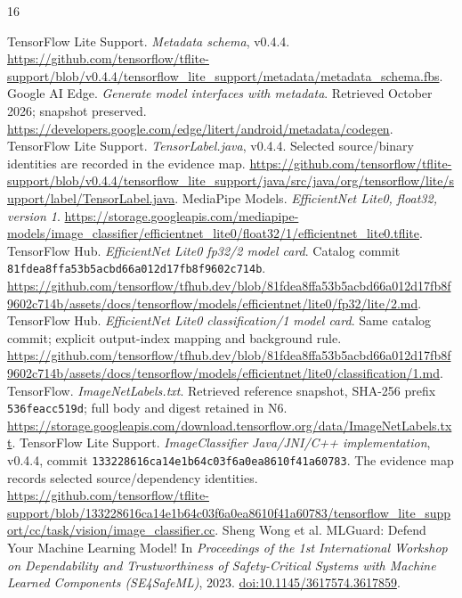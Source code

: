 \documentclass[10pt,conference]{IEEEtran}
\newcommand{\code}[1]{\texttt{#1}}
\begin{document}
\begin{thebibliography}{16}\small\raggedright
{} TensorFlow Lite Support. \emph{Metadata schema}, v0.4.4. \url{https://github.com/tensorflow/tflite-support/blob/v0.4.4/tensorflow_lite_support/metadata/metadata_schema.fbs}.
 Google AI Edge. \emph{Generate model interfaces with metadata}. Retrieved October 2026; snapshot preserved. \url{https://developers.google.com/edge/litert/android/metadata/codegen}.
 TensorFlow Lite Support. \emph{TensorLabel.java}, v0.4.4. Selected source/binary identities are recorded in the evidence map. \url{https://github.com/tensorflow/tflite-support/blob/v0.4.4/tensorflow_lite_support/java/src/java/org/tensorflow/lite/support/label/TensorLabel.java}.
 MediaPipe Models. \emph{EfficientNet Lite0, float32, version 1}. \url{https://storage.googleapis.com/mediapipe-models/image_classifier/efficientnet_lite0/float32/1/efficientnet_lite0.tflite}.
 TensorFlow Hub. \emph{EfficientNet Lite0 fp32/2 model card}. Catalog commit \code{81fdea8ffa53b5acbd66a012d17fb8f9602c714b}. \url{https://github.com/tensorflow/tfhub.dev/blob/81fdea8ffa53b5acbd66a012d17fb8f9602c714b/assets/docs/tensorflow/models/efficientnet/lite0/fp32/lite/2.md}.
 TensorFlow Hub. \emph{EfficientNet Lite0 classification/1 model card}. Same catalog commit; explicit output-index mapping and background rule. \url{https://github.com/tensorflow/tfhub.dev/blob/81fdea8ffa53b5acbd66a012d17fb8f9602c714b/assets/docs/tensorflow/models/efficientnet/lite0/classification/1.md}.
 TensorFlow. \emph{ImageNetLabels.txt}. Retrieved reference snapshot, SHA-256 prefix \code{536feacc519d}; full body and digest retained in N6. \url{https://storage.googleapis.com/download.tensorflow.org/data/ImageNetLabels.txt}.
 TensorFlow Lite Support. \emph{ImageClassifier Java/JNI/C++ implementation}, v0.4.4, commit \code{133228616ca14e1b64c03f6a0ea8610f41a60783}. The evidence map records selected source/dependency identities. \url{https://github.com/tensorflow/tflite-support/blob/133228616ca14e1b64c03f6a0ea8610f41a60783/tensorflow_lite_support/cc/task/vision/image_classifier.cc}.
 Sheng Wong et al. MLGuard: Defend Your Machine Learning Model! In \emph{Proceedings of the 1st International Workshop on Dependability and Trustworthiness of Safety-Critical Systems with Machine Learned Components (SE4SafeML)}, 2023. \href{https://doi.org/10.1145/3617574.3617859}{doi:10.1145/3617574.3617859}.


\end{thebibliography}
\end{document}
